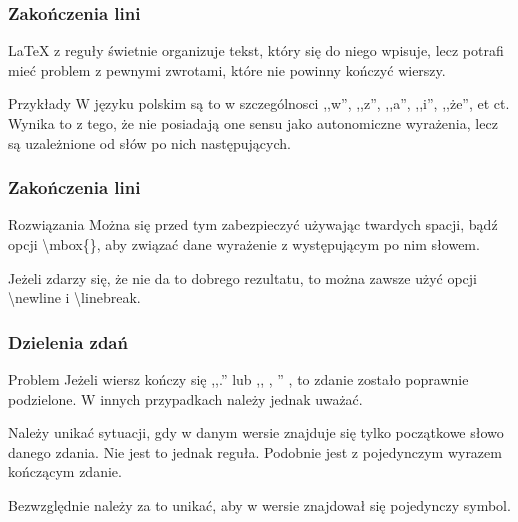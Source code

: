 \documentclass{beamer}
\begin{document}
\begin{frame}
  \frametitle{Zakończenia lini}


\begin{block}{}
  \LaTeX{ } z reguły świetnie organizuje tekst, który się do niego
  wpisuje, lecz potrafi mieć problem z pewnymi zwrotami, które nie
  powinny kończyć wierszy.

\end{block}
\pause

\begin{block}{Przykłady}
  W języku polskim są to w szczególnosci ,,w'', ,,z'', ,,a'', ,,i'',
  ,,że'', \linebreak et ct. Wynika to z tego, że nie posiadają one
  sensu jako autonomiczne wyrażenia, lecz są uzależnione od słów po
  nich następujących.
\end{block}


\end{frame}



\begin{frame}
  \frametitle{Zakończenia lini}
  \pause

\begin{block}{Rozwiązania}
  Można się przed tym zabezpieczyć używając twardych spacji,\linebreak
  bądź opcji \textbackslash mbox\{\}, aby związać dane wyrażenie z
  występującym po nim słowem.
\end{block}
\pause

\begin{block}{}
  Jeżeli zdarzy się, że nie da to dobrego rezultatu, to można zawsze
  użyć opcji \textbackslash newline i \textbackslash linebreak.
\end{block}


\end{frame}



\begin{frame}
  \frametitle{Dzielenia zdań}
  \pause

\begin{block}{Problem}
  Jeżeli wiersz kończy się ,,.'' lub ,, , '' , to zdanie zostało
  poprawnie podzielone. W innych przypadkach należy jednak uważać.
\end{block}
\pause

\begin{block}{}
  Należy unikać sytuacji, gdy w danym wersie znajduje się tylko
  początkowe słowo danego zdania. Nie jest to jednak reguła. \pause
  Podobnie jest z pojedynczym wyrazem kończącym zdanie.
\end{block}
\pause

\begin{block}{}
  Bezwzględnie należy za to unikać, aby w wersie znajdował się
  pojedynczy symbol.
\end{block}


\end{frame}
\end{document}
